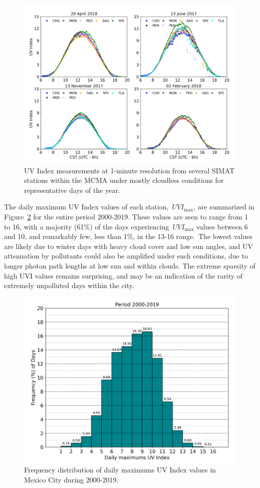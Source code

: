 \documentclass[journal=jacsat,manuscript=article]{achemso}
\begin{document}
\begin{figure}[H]
  \begin{center}
    \includegraphics[width=0.70\columnwidth]{figures/season}
    \caption{{UV Index measurements at 1-minute resolution from several SIMAT stations within the MCMA
          under mostly cloudless conditions for representative days of the year.
            {\label{628947}}%
        }}
  \end{center}
\end{figure}

The daily maximum UV Index values of each station,~\(UVI_{\max}\),
are summarized in Figure~{\ref{461017}} for the entire period 2000-2019.
These values are seen to range
from 1 to 16, with a majority (61\%) of the days
experiencing~\(UVI_{\max}\) values between 6 and 10, and remarkably
few, less than 1\%, in the 13-16 range.~The lowest values are
likely due to winter days with heavy cloud cover and low sun angles, and
UV attenuation by pollutants could also be amplified under such
conditions, due to longer photon path lengths at low sun and within
clouds. The extreme sparsity of high UVI values remains surprising, and
may be an indication of the rarity of extremely unpolluted days within
the city.

\begin{figure}[H]
  \begin{center}
    \includegraphics[width=0.49\columnwidth]{figures/Histogram}
    \caption{{Frequency distribution of daily maximums UV Index values in Mexico City
    during 2000-2019.
    {\label{461017}}%
    }}
  \end{center}
\end{figure}
\end{document}
